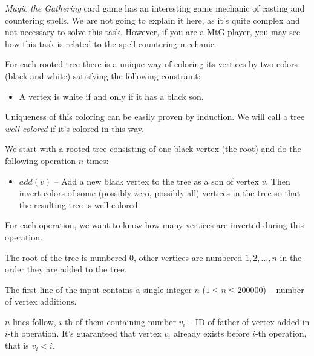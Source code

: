 





\emph{Magic the Gathering} card game has an interesting game mechanic
of casting and countering spells. We are not going to explain it here,
as it's quite complex and not necessary to solve this task. However, if 
you are a MtG player, you may see how this task is related to the spell
countering mechanic.


For each rooted tree there is a unique way of coloring its vertices by two colors
(black and white) satisfying the following constraint:
\begin{itemize}
\item A vertex is white if and only if it has a black son.
\end{itemize}

Uniqueness of this coloring can be easily proven by induction.
We will call a tree \emph{well-colored} if it's colored in this way.


We start with a rooted tree consisting of one black vertex (the root) and do
the following operation $n$-times:

\begin{itemize}
\item $add(v)$ -- Add a new black vertex to the tree as a son of vertex $v$. Then
                  invert colors of some (possibly zero, possibly all) vertices in
                  the tree so that the resulting tree is well-colored.
\end{itemize}

For each operation, we want to know how many vertices are inverted during this operation.


The root of the tree is numbered $0$, other vertices are numbered $1, 2, \dots, n$ in the 
order they are added to the tree.

The first line of the input contains a single integer $n$ ($1 \leq n \leq 200000$) -- 
number of vertex additions.

$n$ lines follow, $i$-th of them containing number $v_i$ -- ID of father of vertex added in
$i$-th operation. It's guaranteed that vertex $v_i$ already exists before $i$-th operation,
that is $v_i < i$.

